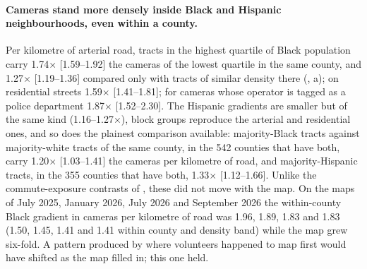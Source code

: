 \documentclass[11pt,twoside]{article}
\begin{document}
\paragraph{Cameras stand more densely inside Black and Hispanic neighbourhoods, even within a
county.} Per kilometre of arterial road, tracts in the highest quartile of Black population carry
\num{1.74}$\times$ [1.59--1.92] the cameras of the lowest quartile in the same county, and
\num{1.27}$\times$ [1.19--1.36] compared only with tracts of similar density there
(, a); on residential streets \num{1.59}$\times$ [1.41--1.81];
for cameras whose operator is tagged as a police department \num{1.87}$\times$ [1.52--2.30]. The
Hispanic gradients are smaller but of the same kind (\numrange{1.16}{1.27}$\times$), block groups
reproduce the arterial and residential ones, and so does the plainest comparison available:
majority-Black tracts against majority-white tracts of the same county, in the 542 counties that
have both, carry \num{1.20}$\times$ [1.03--1.41] the cameras per kilometre of road, and
majority-Hispanic tracts, in the 355 counties that have both, \num{1.33}$\times$
[1.12--1.66]. Unlike the commute-exposure contrasts of
, these did not move with the map. On the maps of July 2025, January 2026, July 2026 and September
2026 the within-county Black gradient in cameras per kilometre of road was \num{1.96}, \num{1.89},
\num{1.83} and \num{1.83} (\num{1.50}, \num{1.45}, \num{1.41} and \num{1.41} within county and density
band) while the map grew six-fold. A pattern produced by where
volunteers happened to map first would have shifted as the map filled in; this one held.
\end{document}
